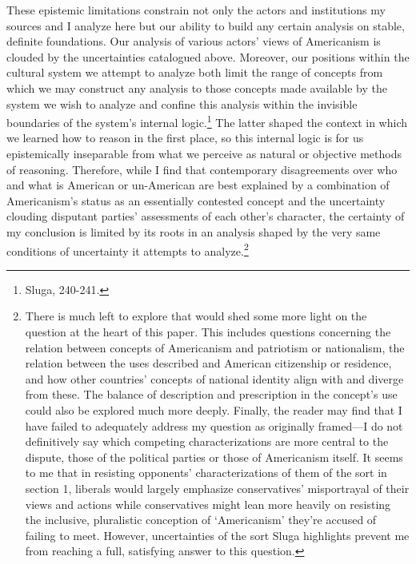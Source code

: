 These epistemic limitations constrain not only the actors and
institutions my sources and I analyze here but our ability to build any
certain analysis on stable, definite foundations. Our analysis of
various actors' views of Americanism is clouded by the uncertainties
catalogued above. Moreover, our positions within the cultural system we
attempt to analyze both limit the range of concepts from which we may
construct any analysis to those concepts made available by the system we
wish to analyze and confine this analysis within the invisible
boundaries of the system's internal logic.\footnote{Sluga, 240-241.} The
latter shaped the context in which we learned how to reason in the first
place, so this internal logic is for us epistemically inseparable from
what we perceive as natural or objective methods of reasoning.
Therefore, while I find that contemporary disagreements over who and
what is American or un-American are best explained by a combination of
Americanism's status as an essentially contested concept and the
uncertainty clouding disputant parties' assessments of each other's
character, the certainty of my conclusion is limited by its roots in an
analysis shaped by the very same conditions of uncertainty it attempts
to analyze.\footnote{There is much left to explore that would shed some
  more light on the question at the heart of this paper. This includes
  questions concerning the relation between concepts of Americanism and
  patriotism or nationalism, the relation between the uses described and
  American citizenship or residence, and how other countries' concepts
  of national identity align with and diverge from these. The balance of
  description and prescription in the concept's use could also be
  explored much more deeply. Finally, the reader may find that I have
  failed to adequately address my question as originally framed---I do
  not definitively say which competing characterizations are more
  central to the dispute, those of the political parties or those of
  Americanism itself. It seems to me that in resisting opponents'
  characterizations of them of the sort in section 1, liberals would
  largely emphasize conservatives' misportrayal of their views and
  actions while conservatives might lean more heavily on resisting the
  inclusive, pluralistic conception of `Americanism' they're accused of
  failing to meet. However, uncertainties of the sort Sluga highlights
  prevent me from reaching a full, satisfying answer to this question.}

\clearpage
